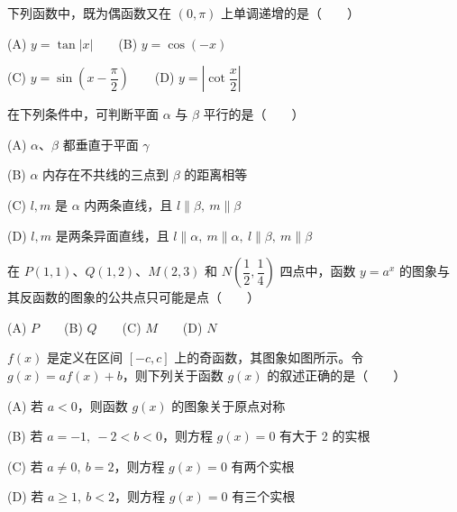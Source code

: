 \begin{question}
下列函数中，既为偶函数又在 \((0,\pi)\) 上单调递增的是\mbox{（　　）}

    (A) \(y=\tan|x|\)　　(B) \(y=\cos(-x)\)

    (C) \(y=\sin\left(x-\dfrac{\pi}{2}\right)\)　　(D) \(y=\left|\cot\dfrac{x}{2}\right|\)

\end{question}
\begin{question}
在下列条件中，可判断平面 \(\alpha\) 与 \(\beta\) 平行的是\mbox{（　　）}

    (A) \(\alpha、\beta\) 都垂直于平面 \(\gamma\)

    (B) \(\alpha\) 内存在不共线的三点到 \(\beta\) 的距离相等

    (C) \(l,m\) 是 \(\alpha\) 内两条直线，且 \(l\parallel\beta,\ m\parallel\beta\)

    (D) \(l,m\) 是两条异面直线，且 \(l\parallel\alpha,\ m\parallel\alpha,\ l\parallel\beta,\ m\parallel\beta\)

\end{question}
\begin{question}
在 \(P(1,1)、Q(1,2)、M(2,3)\) 和 \(N\left(\dfrac12,\dfrac14\right)\) 四点中，函数 \(y=a^x\) 的图象与其反函数的图象的公共点只可能是点\mbox{（　　）}

    (A) \(P\)　　(B) \(Q\)　　(C) \(M\)　　(D) \(N\)

\Needspace{0.4\textheight}
\end{question}
\begin{question}
\(f(x)\) 是定义在区间 \([-c,c]\) 上的奇函数，其图象如图所示。令 \(g(x)=af(x)+b\)，则下列关于函数 \(g(x)\) 的叙述正确的是\mbox{（　　）}

    (A) 若 \(a<0\)，则函数 \(g(x)\) 的图象关于原点对称

    (B) 若 \(a=-1,\ -2<b<0\)，则方程 \(g(x)=0\) 有大于 2 的实根

    (C) 若 \(a\ne0,\ b=2\)，则方程 \(g(x)=0\) 有两个实根

    (D) 若 \(a\ge1,\ b<2\)，则方程 \(g(x)=0\) 有三个实根
\nopagebreak[4]
\begin{center}\end{center}
\nopagebreak[4]
\end{question}

